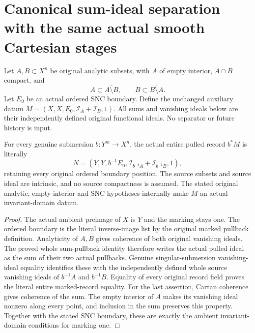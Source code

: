 \section{Canonical sum-ideal separation with the same actual smooth Cartesian stages}

Let $A,B\subset X^n$ be original analytic subsets, with $A$ of empty
interior, $A\cap B$ compact, and
\[
 A\subset\overline{A\setminus B},\qquad
 B\subset\overline{B\setminus A}.
\]
Let $E_0$ be an actual ordered SNC boundary. Define the unchanged
auxiliary datum
$M=(X,X,E_0,\mathcal I_A+\mathcal I_B,1)$.
All sums and vanishing ideals below are their independently defined
original functional ideals. No separator or future history is input.

\begin{lemma}
\label{hir:original-canonical-sum-intrinsic-source-record}
\leanok
For every genuine submersion $b:Y^m\to X^n$, the actual entire pulled
record $b^*M$ is literally
\[
 N=(Y,Y,b^{-1}E_0,\mathcal I_{b^{-1}A}+\mathcal I_{b^{-1}B},1),
\]
retaining every original ordered boundary position. The source subsets
and source ideal are intrinsic, and no source compactness is assumed.
The stated original analytic, empty-interior and SNC hypotheses internally
make $M$ an actual invariant-domain datum.
\end{lemma}
\begin{proof}
The actual ambient preimage of $X$ is $Y$ and the marking stays one.
The ordered boundary is the literal inverse-image list by the original
marked pullback definition. Analyticity of $A,B$ gives coherence of both
original vanishing ideals. The proved whole sum-pullback identity
therefore writes the actual pulled ideal as the sum of their two actual
pullbacks. Genuine singular-submersion vanishing-ideal equality identifies
these with the independently defined whole source vanishing ideals of
$b^{-1}A$ and $b^{-1}B$. Equality of every original record field proves
the literal entire marked-record equality.
For the last assertion, Cartan coherence gives coherence of the sum.
The empty interior of $A$ makes its vanishing ideal nonzero along every
point, and inclusion in the sum preserves this property. Together with
the stated SNC boundary, these are exactly the ambient invariant-domain
conditions for marking one.
\end{proof}

